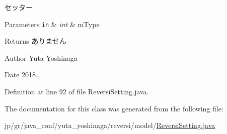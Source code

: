 セッター 


\begin{DoxyParams}[1]{Parameters}
\mbox{\tt in}  & {\em int} & m\+Type \\
\hline
\end{DoxyParams}
\begin{DoxyReturn}{Returns}
ありません 
\end{DoxyReturn}
\begin{DoxyAuthor}{Author}
Yuta Yoshinaga 
\end{DoxyAuthor}
\begin{DoxyDate}{Date}
2018.. 
\end{DoxyDate}


Definition at line 92 of file Reversi\+Setting.\+java.



The documentation for this class was generated from the following file\+:\begin{DoxyCompactItemize}
\item 
jp/gr/java\+\_\+conf/yuta\+\_\+yoshinaga/reversi/model/\hyperlink{_reversi_setting_8java}{Reversi\+Setting.\+java}\end{DoxyCompactItemize}
